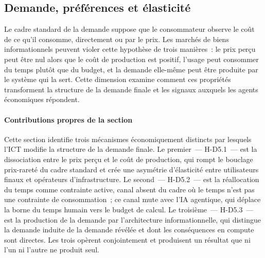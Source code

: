 \subsection{Demande, préférences et élasticité}


Le cadre standard de la demande suppose que le consommateur observe le coût de ce qu'il consomme, directement ou par le prix. Les marchés de biens informationnels peuvent violer cette hypothèse de trois manières~: le prix perçu peut être nul alors que le coût de production est positif, l'usage peut consommer du temps plutôt que du budget, et la demande elle-même peut être produite par le système qui la sert. Cette dimension examine comment ces propriétés transforment la structure de la demande finale et les signaux auxquels les agents économiques répondent.

\paragraph{Contributions propres de la section}
Cette section identifie trois mécanismes économiquement distincts par lesquels l'ICT modifie la structure de la demande finale. Le premier~--- H-D5.1~--- est la dissociation entre le prix perçu et le coût de production, qui rompt le bouclage prix-rareté du cadre standard et crée une asymétrie d'élasticité entre utilisateurs finaux et opérateurs d'infrastructure. Le second~--- H-D5.2~--- est la réallocation du temps comme contrainte active, canal absent du cadre où le temps n'est pas une contrainte de consommation~; ce canal mute avec l'IA agentique, qui déplace la borne du temps humain vers le budget de calcul. Le troisième~--- H-D5.3~--- est la production de la demande par l'architecture informationnelle, qui distingue la demande induite de la demande révélée et dont les conséquences en compute sont directes. Les trois opèrent conjointement et produisent un résultat que ni l'un ni l'autre ne produit seul.


